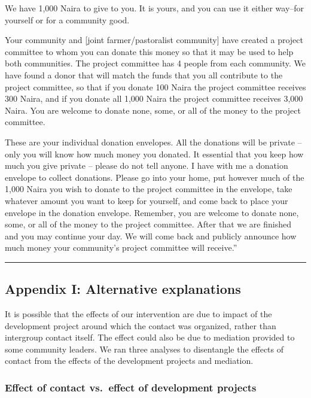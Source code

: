 \documentclass[
]{article}
\begin{document}
We have 1,000 Naira to give to you. It is yours, and you can use it
either way--for yourself or for a community good.

Your community and {[}joint farmer/pastoralist community{]} have created
a project committee to whom you can donate this money so that it may be
used to help both communities. The project committee has 4 people from
each community. We have found a donor that will match the funds that you
all contribute to the project committee, so that if you donate 100 Naira
the project committee receives 300 Naira, and if you donate all 1,000
Naira the project committee receives 3,000 Naira. You are welcome to
donate none, some, or all of the money to the project committee.

These are your individual donation envelopes. All the donations will be
private -- only you will know how much money you donated. It essential
that you keep how much you give private -- please do not tell anyone. I
have with me a donation envelope to collect donations. Please go into
your home, put however much of the 1,000 Naira you wish to donate to the
project committee in the envelope, take whatever amount you want to keep
for yourself, and come back to place your envelope in the donation
envelope. Remember, you are welcome to donate none, some, or all of the
money to the project committee. After that we are finished and you may
continue your day. We will come back and publicly announce how much
money your community's project committee will receive.''

\begin{center}\rule{0.5\linewidth}{0.5pt}\end{center}

\hypertarget{appendix-i-alternative-explanations}{%
\subsection{Appendix I: Alternative
explanations}\label{appendix-i-alternative-explanations}}

It is possible that the effects of our intervention are due to impact of
the development project around which the contact was organized, rather
than intergroup contact itself. The effect could also be due to
mediation provided to some community leaders. We ran three analyses to
disentangle the effects of contact from the effects of the development
projects and mediation.

\hypertarget{effect-of-contact-vs.-effect-of-development-projects}{%
\subsubsection{Effect of contact vs.~effect of development
projects}\label{effect-of-contact-vs.-effect-of-development-projects}}
\end{document}

